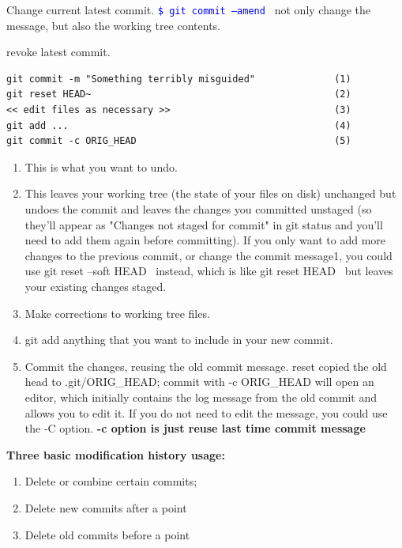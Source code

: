 \documentclass[paper=8.5in:11in, twoside, 12pt, pagesize=pdftex]{book}
\newcommand{\linuxcommand}[1]{\texttt{\textcolor{blue}{\$ #1 \Pisymbol{psy}{191}}}}
\begin{document}
	Change current latest commit. \linuxcommand{git commit  --amend} not only change the message, but also the working tree contents. 
	
	revoke latest commit.
\begin{lstlisting}
git commit -m "Something terribly misguided"              (1)
git reset HEAD~                                           (2)
<< edit files as necessary >>                             (3)
git add ...                                               (4)
git commit -c ORIG_HEAD                                   (5)		
\end{lstlisting}
	
	\begin{enumerate}
		\item This is what you want to undo.
		
		\item This leaves your working tree (the state of your files on disk) unchanged but undoes the commit and leaves the changes you committed unstaged (so they'll appear as "Changes not staged for commit" in git status and you'll need to add them again before committing). If you only want to add more changes to the previous commit, or change the commit message1, you could use git reset --soft HEAD~ instead, which is like git reset HEAD~ but leaves your existing changes staged.
		
		\item Make corrections to working tree files.
		
		\item git add anything that you want to include in your new commit.
		
		\item Commit the changes, reusing the old commit message. reset copied the old head to .git/ORIG\_HEAD; commit with -c ORIG\_HEAD will open an editor, which initially contains the log message from the old commit and allows you to edit it. If you do not need to edit the message, you could use the -C option.  \textbf{-c option is just reuse last time commit message}
	\end{enumerate}
	
	
	
	\textbf{Three basic modification history usage:}
	\begin{enumerate}
		\item Delete or combine certain commits;
		\item Delete new commits after a point
		\item Delete old commits before a point
	\end{enumerate}
	
\end{document}
